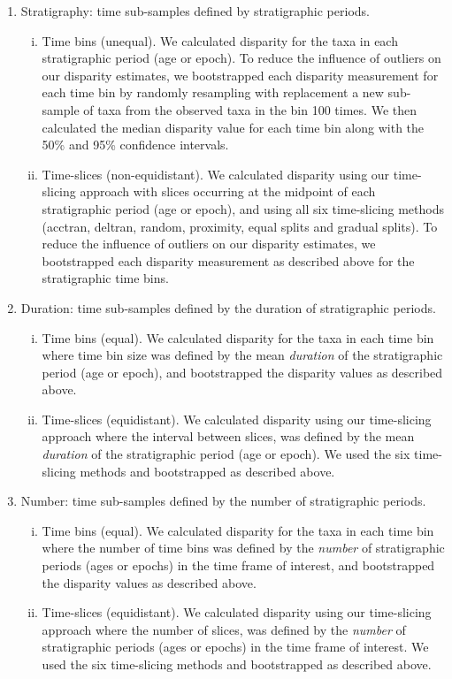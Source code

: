 \documentclass[12pt,a4paper]{article}
\begin{document}
\begin{enumerate}
  \item Stratigraphy: time sub-samples defined by stratigraphic periods. 
  \begin{enumerate}[(i)]
    \item Time bins (unequal). 
    We calculated disparity for the taxa in each stratigraphic period (age or epoch). 
    To reduce the influence of outliers on our disparity estimates, we bootstrapped each disparity measurement for each time bin by randomly resampling with replacement a new sub-sample of taxa from the observed taxa in the bin 100 times.
    We then calculated the median disparity value for each time bin along with the 50\% and 95\% confidence intervals.
    \item Time-slices (non-equidistant).
    We calculated disparity using our time-slicing approach with slices occurring at the midpoint of each stratigraphic period (age or epoch), and using all six time-slicing methods (acctran, deltran, random, proximity, equal splits and gradual splits).
    To reduce the influence of outliers on our disparity estimates, we bootstrapped each disparity measurement as described above for the stratigraphic time bins.
    \end{enumerate}

  \item Duration: time sub-samples defined by the duration of stratigraphic periods. 
  \begin{enumerate}[(i)]
    \item Time bins (equal). 
    We calculated disparity for the taxa in each time bin where time bin size was defined by the mean \textit{duration} of the stratigraphic period (age or epoch), and bootstrapped the disparity values as described above.
    \item Time-slices (equidistant).
    We calculated disparity using our time-slicing approach where the interval between slices, was defined by the mean \textit{duration} of the stratigraphic period (age or epoch).
    We used the six time-slicing methods and bootstrapped as described above.
  \end{enumerate}

  \item Number: time sub-samples defined by the number of stratigraphic periods. 
  \begin{enumerate}[(i)]
    \item Time bins (equal). 
    We calculated disparity for the taxa in each time bin where the number of time bins was defined by the \textit{number} of stratigraphic periods (ages or epochs) in the time frame of interest, and bootstrapped the disparity values as described above.
    \item Time-slices (equidistant).
    We calculated disparity using our time-slicing approach where the number of slices, was defined by the \textit{number} of stratigraphic periods (ages or epochs) in the time frame of interest.
    We used the six time-slicing methods and bootstrapped as described above.
  \end{enumerate}

\end{enumerate}
\end{document}
